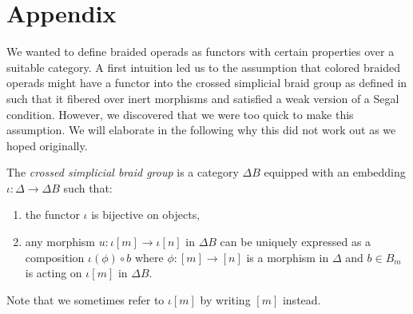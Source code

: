 \section{Appendix}


We wanted to define braided operads as functors with certain properties over a suitable category. 
A first intuition led us to the assumption that colored braided operads might 
have a functor into the crossed simplicial braid group as defined in \cite{Dyckerhoff} such that
it fibered over inert morphisms and satisfied a weak version of a Segal condition.
However, we discovered that we were too quick to make this assumption. 
We will elaborate in the following why this did not work out as we hoped originally.

\begin{defin}\label{crossed_braid} The {\em crossed simplicial braid group} is a category $\Delta B$ equipped with an embedding
	$\iota:\Delta \to \Delta B$ such that:
	\begin{enumerate}
		\item the functor $\iota$ is bijective on objects,
		\item any morphism $u: \iota[m] \to \iota[n]$ in $\Delta B$ can be uniquely expressed as 
			a composition $\iota(\phi) \circ b$ where $\phi: [m] \to [n]$ is a morphism in
			$\Delta$ and $b \in B_m$ is acting on $\iota[m]$ in $\Delta B$.
	\end{enumerate}
    Note that we sometimes refer to $\iota[m]$ by writing $[m]$ instead.
\end{defin}

